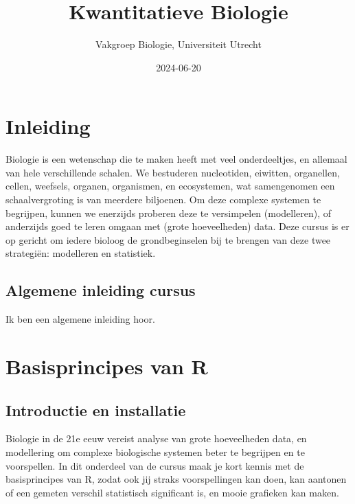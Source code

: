 \documentclass[
  a4paper,
]{scrbook}
\title{Kwantitatieve Biologie}
\author{Vakgroep Biologie, Universiteit Utrecht}
\date{2024-06-20}
\renewcommand*\contentsname{Inhoudsopgave}
\newcommand\contentsname{Inhoudsopgave}
\theoremstyle{definition}
\theoremstyle{remark}
\begin{document}
\frontmatter
\maketitle
\ifdefined\Shaded\renewenvironment{Shaded}{\begin{tcolorbox}[boxrule=0pt, breakable, sharp corners, frame hidden, interior hidden, enhanced, borderline west={3pt}{0pt}{shadecolor}]}{\end{tcolorbox}}\fi

\renewcommand*\contentsname{Inhoudsopgave}
{
\setcounter{tocdepth}{1}
\tableofcontents
}
\mainmatter
\part{Inleiding}

Biologie is een wetenschap die te maken heeft met veel onderdeeltjes, en
allemaal van hele verschillende schalen. We bestuderen nucleotiden,
eiwitten, organellen, cellen, weefsels, organen, organismen, en
ecosystemen, wat samengenomen een schaalvergroting is van meerdere
biljoenen. Om deze complexe systemen te begrijpen, kunnen we enerzijds
proberen deze te versimpelen (modelleren), of anderzijds goed te leren
omgaan met (grote hoeveelheden) data. Deze cursus is er op gericht om
iedere bioloog de grondbeginselen bij te brengen van deze twee
strategiën: modelleren en statistiek.

\hypertarget{algemene-inleiding-cursus}{%
\chapter{Algemene inleiding cursus}\label{algemene-inleiding-cursus}}

Ik ben een algemene inleiding hoor.

\part{Basisprincipes van R}

\hypertarget{introductie-en-installatie}{%
\chapter{Introductie en installatie}\label{introductie-en-installatie}}

Biologie in de 21e eeuw vereist analyse van grote hoeveelheden data, en
modellering om complexe biologische systemen beter te begrijpen en te
voorspellen. In dit onderdeel van de cursus maak je kort kennis met de
basisprincipes van R, zodat ook jij straks voorspellingen kan doen, kan
aantonen of een gemeten verschil statistisch significant is, en mooie
grafieken kan maken.
\end{document}
